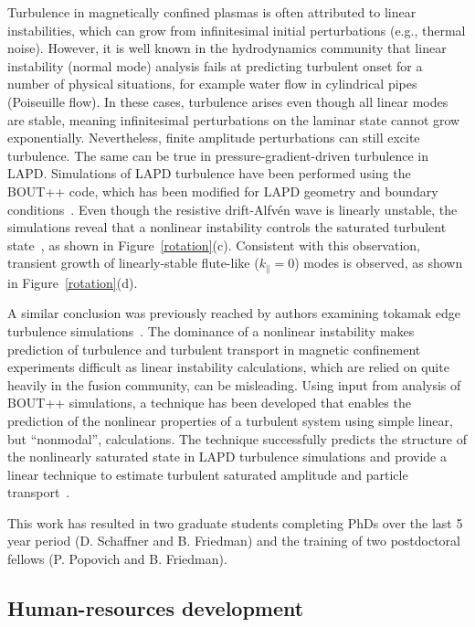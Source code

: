 \documentclass[11pt]{article}
\renewcommand{\cite}{\citep}
\begin{document}
Turbulence in magnetically confined plasmas is often attributed to
linear instabilities, which can grow from infinitesimal initial
perturbations (e.g., thermal noise). However, it is well known in the
hydrodynamics community that linear instability (normal mode) analysis
fails at predicting turbulent onset for a number of physical
situations, for example water flow in cylindrical pipes (Poiseuille
flow). In these cases, turbulence arises even though all linear modes
are stable, meaning infinitesimal perturbations on the laminar state
cannot grow exponentially. Nevertheless, finite amplitude
perturbations can still excite turbulence.  The same
can be true in pressure-gradient-driven turbulence in LAPD.
Simulations of LAPD turbulence have been performed using the BOUT++
code, which has been modified for
LAPD geometry and boundary
conditions~\cite{popovich:2010a,popovich:2010b,umansky:2011,friedman:2012a}.  Even though the
resistive drift-Alfv\'{e}n wave is linearly unstable, the simulations reveal that a
nonlinear instability controls the saturated turbulent state~\cite{friedman:2012b,friedman:2013,friedman:2014,friedman:2015},
as shown in Figure~\ref{rotation}(c).  Consistent with this observation, transient growth of linearly-stable
flute-like ($k_\parallel = 0$) modes is observed, as shown in
Figure~\ref{rotation}(d).  


A similar conclusion was previously reached by authors examining
tokamak edge turbulence simulations~\cite{drake:1995, biskamp:1995,
scott:1990}.  The dominance of a nonlinear instability makes prediction
of turbulence and turbulent transport in magnetic confinement
experiments difficult as linear instability calculations, which are
relied on quite heavily in the fusion community, can be misleading.
Using input from analysis of BOUT++ simulations, a technique has been developed 
that enables the prediction of the nonlinear properties of a turbulent
system using simple linear, but ``nonmodal'', calculations. The
technique successfully predicts the structure of the nonlinearly
saturated state in LAPD turbulence simulations and provide a linear
technique to estimate turbulent saturated amplitude and particle
transport~\cite{friedman:2014,friedman:2015}.  

This work has resulted in two graduate students completing PhDs over
the last 5 year period (D. Schaffner and B. Friedman) and the
training of two postdoctoral fellows (P. Popovich and B.
Friedman).  

\subsection{Human-resources development}
\end{document}
